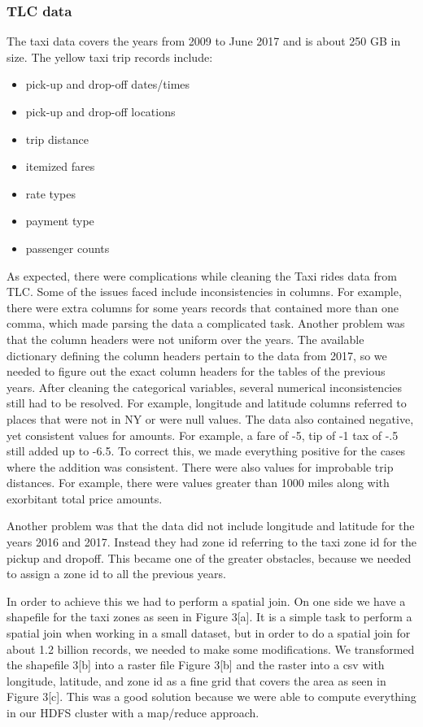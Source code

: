 \documentclass{sigkddExp}
\begin{document}
\subsubsection{TLC data}

The taxi data covers the years from 2009 to June 2017 and is about 250 GB in size. The yellow taxi trip records include:

\begin{itemize}
\item pick-up and drop-off dates/times 
\item pick-up and drop-off locations 
\item trip distance
\item itemized fares 
\item rate types 
\item payment type 
\item passenger counts 
\end{itemize}

As expected, there were complications while cleaning the Taxi rides data from TLC. Some of the issues faced include inconsistencies in columns. For example, there were extra columns for some years records that contained more than one comma, which made parsing the data a complicated task. 
Another problem was that the column headers were not uniform over the years. The available dictionary defining the column headers pertain to the data from 2017, so we needed to figure out the exact column headers for the tables of the previous years.
After cleaning the categorical variables, several numerical inconsistencies still had to be resolved. For example, longitude and latitude columns referred to places that were not in NY or were null values. The data also contained negative, yet consistent values for amounts. For example, a fare of -5, tip of -1 tax of -.5 still added up to -6.5. To correct this, we made everything positive for the cases where the addition was consistent. There were also values for improbable trip distances. For example, there were values greater than 1000 miles along with exorbitant total price amounts.

Another problem was that the data did not include longitude and latitude for the years 2016 and 2017. Instead they had zone id referring to the taxi zone id for the pickup and dropoff. This became one of the greater obstacles, because we needed to assign a zone id to all the previous years. 

In order to achieve this we had to perform a spatial join. On one side we have a shapefile for the taxi zones as seen in Figure 3[a]. It is a simple task to perform a spatial join when working in a small dataset, but in order to do a spatial join for about 1.2 billion records, we needed to make some modifications. We transformed the shapefile 3[b] into a raster file Figure 3[b] and the raster into a csv with longitude, latitude, and zone id as a fine grid that covers the area as seen in Figure 3[c]. This was a good solution because we were able to compute everything in our HDFS cluster with a map/reduce approach.
\end{document}
